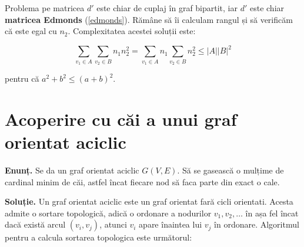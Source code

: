 Problema pe matricea $d'$ este chiar de cuplaj în graf bipartit, iar $d'$ este chiar \textbf{matricea Edmonds} (\ref{edmonds}). Rămâne să îi calculam
rangul și să verificăm că este egal cu $n_{2}$. Complexitatea acestei soluții este:

\begin{equation}
  \displaystyle\sum\limits_{v_{1} \in A} \displaystyle\sum\limits_{v_{2} \in B} n_{1}n_{2}^{2} = \displaystyle\sum\limits_{v_{1} \in A} n_{1} \displaystyle\sum\limits_{v_{2} \in B} n_{2}^{2} \leq |A||B|^{2}
\end{equation}

\noindent pentru că $a^{2} + b^{2} \leq (a + b)^{2}$.

\pagebreak

\section{Acoperire cu căi a unui graf orientat aciclic}

\noindent \textbf{Enunț.} Se da un graf orientat aciclic $G(V, E)$. Să se gasească o mulțime de cardinal minim de căi, astfel încat
fiecare nod să faca parte din exact o cale.

\noindent \textbf{Soluție.} Un graf orientat aciclic este un graf orientat fară cicli orientati. Acesta admite o sortare topologică,
adică o ordonare a nodurilor $v_{1}, v_{2}, \ldots$ în așa fel încat dacă există arcul $(v_{i}, v_{j})$, atunci $v_{i}$ apare înaintea
lui $v_{j}$ în ordonare. Algoritmul pentru a calcula sortarea topologica este următorul:

\begin{algorithm}[H]
  \DontPrintSemicolon
  \;
\end{algorithm}

\begin{algorithm}[H]
  \DontPrintSemicolon
  \;
\end{algorithm}

\pagebreak


